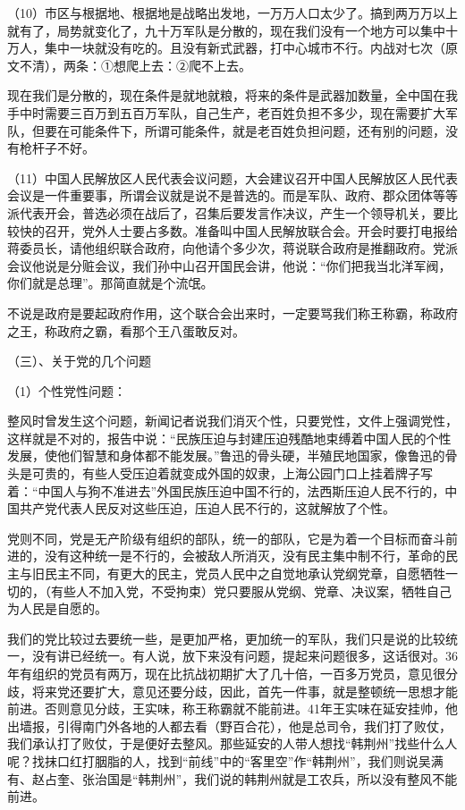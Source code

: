 （10）市区与根据地、根据地是战略出发地，一万万人口太少了。搞到两万万以上就有了，局势就变化了，九十万军队是分散的，现在我们没有一个地方可以集中十万人，集中一块就没有吃的。且没有新式武器，打中心城市不行。内战对七次（原文不清），两条：①想爬上去：②爬不上去。

现在我们是分散的，现在条件是就地就粮，将来的条件是武器加数量，全中国在我手中时需要三百万到五百万军队，自己生产，老百姓负担不多少，现在需要扩大军队，但要在可能条件下，所谓可能条件，就是老百姓负担问题，还有别的问题，没有枪杆子不好。

（11）中国人民解放区人民代表会议问题，大会建议召开中国人民解放区人民代表会议是一件重要事，所谓会议就是说不是普选的。而是军队、政府、郡众团体等等派代表开会，普选必须在战后了，召集后要发言作决议，产生一个领导机关，要比较快的召开，党外人士要占多数。准备叫中国人民解放联合会。开会时要打电报给蒋委员长，请他组织联合政府，向他请个多少次，蒋说联合政府是推翻政府。党派会议他说是分赃会议，我们孙中山召开国民会讲，他说：“你们把我当北洋军阀，你们就是总理”。那简直就是个流氓。

不说是政府是要起政府作用，这个联合会出来时，一定要骂我们称王称霸，称政府之王，称政府之霸，看那个王八蛋敢反对。

（三）、关于党的几个问题

（1）个性党性问题：

整风时曾发生这个问题，新闻记者说我们消灭个性，只要党性，文件上强调党性，这样就是不对的，报告中说：“民族压迫与封建压迫残酷地束缚着中国人民的个性发展，使他们智慧和身体都不能发展。”鲁迅的骨头硬，半殖民地国家，像鲁迅的骨头是可贵的，有些人受压迫着就变成外国的奴隶，上海公园门口上挂着牌子写着：“中国人与狗不准进去”外国民族压迫中国不行的，法西斯压迫人民不行的，中国共产党代表人民反对这些压迫，压迫人民不行的，这就解放了个性。

党则不同，党是无产阶级有组织的部队，统一的部队，它是为着一个目标而奋斗前进的，没有这种统一是不行的，会被敌人所消灭，没有民主集中制不行，革命的民主与旧民主不同，有更大的民主，党员人民中之自觉地承认党纲党章，自愿牺牲一切的，（有些人不加入党，不受拘束）党只要服从党纲、党章、决议案，牺牲自己为人民是自愿的。

我们的党比较过去要统一些，是更加严格，更加统一的军队，我们只是说的比较统一，没有讲已经统一。有人说，放下来没有问题，提起来问题很多，这话很对。36年有组织的党员有两万，现在比抗战初期扩大了几十倍，一百多万党员，意见很分歧，将来党还要扩大，意见还要分歧，因此，首先一件事，就是整顿统一思想才能前进。否则意见分歧，王实味，称王称霸就不能前进。41年王实味在延安挂帅，他出墙报，引得南门外各地的人都去看（野百合花），他是总司令，我们打了败仗，我们承认打了败仗，于是便好去整风。那些延安的人带人想找“韩荆州”找些什么人呢？找抹口红打胭脂的人，找到“前线”中的“客里空”作“韩荆州”，我们则说吴满有、赵占奎、张治国是“韩荆州”，我们说的韩荆州就是工农兵，所以没有整风不能前进。

